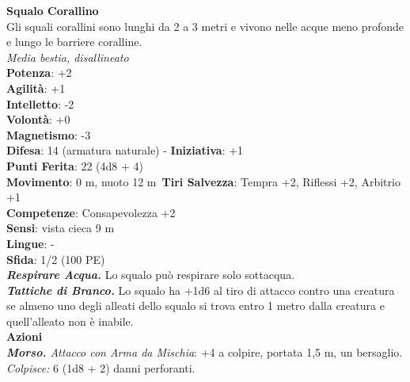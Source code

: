 \begin{multicols}{2}
\medskip\textbf{Squalo Corallino}\\
Gli squali corallini sono lunghi da 2 a 3 metri e vivono  nelle acque meno profonde e lungo le barriere coralline.\\
\emph{Media bestia, disallineato}\\
\textbf{Potenza}: +2\\
\textbf{Agilità}: +1\\
\textbf{Intelletto}: -2\\
\textbf{Volontà}: +0\\
\textbf{Magnetismo}: -3\\
\textbf{Difesa}: 14 (armatura naturale) - \textbf{Iniziativa}: +1\\
\textbf{Punti Ferita}: 22 (4d8 + 4)\\
\textbf{Movimento}: 0 m, nuoto 12 m\
\textbf{Tiri Salvezza}: Tempra +2, Riflessi +2, Arbitrio +1\\
\textbf{Competenze}: Consapevolezza +2\\
\textbf{Sensi}: vista cieca 9 m\\
\textbf{Lingue}: -\\
\textbf{Sfida}: 1/2 (100 PE)\smallskip\\
\emph{\textbf{Respirare Acqua.}} Lo squalo può respirare solo sottacqua.\\
\emph{\textbf{Tattiche di Branco.}} Lo squalo ha +1d6 al tiro di attacco contro una creatura se almeno uno degli alleati dello squalo si  trova entro 1 metro dalla creatura e quell'alleato non è inabile.\\
\smallskip\textbf{Azioni}\\
\emph{\textbf{Morso.} Attacco con Arma da Mischia}: +4 a colpire, portata 1,5 m, un bersaglio.\\
\emph{Colpisce:} 6 (1d8 + 2) danni perforanti.\\


\end{multicols}

